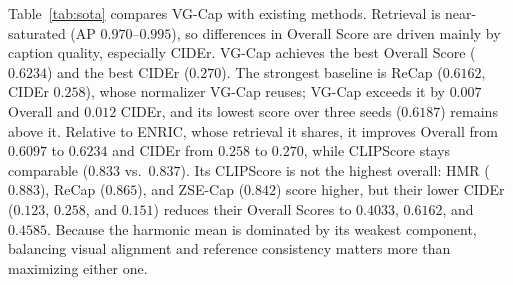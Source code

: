 \documentclass[runningheads]{llncs}
\DeclareRobustCommand{\revise}[1]{{\color{olive}#1}}
\DeclareRobustCommand{\todo}[1]{\ifblank{#1}%
     {{\color{blue}\textbf{[TBD]}}}%
     {{\color{blue}\textbf{[#1]}}}}
\DeclareRobustCommand{\revise}[1]{#1}
\DeclareRobustCommand{\todo}[1]{\PackageError{revision}{Unresolved TODO}{}}
\begin{document}
Table~\ref{tab:sota} compares VG-Cap with existing methods. Retrieval is near-saturated (AP $0.970$--$0.995$), so differences in Overall Score are driven mainly by caption quality, especially CIDEr. VG-Cap achieves the best Overall Score ($0.6234$) and the best CIDEr ($0.270$). \revise{The strongest baseline is ReCap ($0.6162$, CIDEr $0.258$), whose normalizer VG-Cap reuses; VG-Cap exceeds it by $0.007$ Overall and $0.012$ CIDEr, and its lowest score over three seeds ($0.6187$) remains above it.} Relative to ENRIC, whose retrieval it shares, it improves Overall from $0.6097$ to $0.6234$ and CIDEr from $0.258$ to $0.270$, \revise{while CLIPScore stays comparable ($0.833$ vs.\ $0.837$). Its CLIPScore is not the highest overall: HMR ($0.883$), ReCap ($0.865$), and ZSE-Cap ($0.842$) score higher, but their lower CIDEr ($0.123$, $0.258$, and $0.151$) reduces their Overall Scores to $0.4033$, $0.6162$, and $0.4585$.} Because the harmonic mean is dominated by its weakest component, balancing visual alignment and reference consistency matters more than maximizing either one.%
\end{document}
